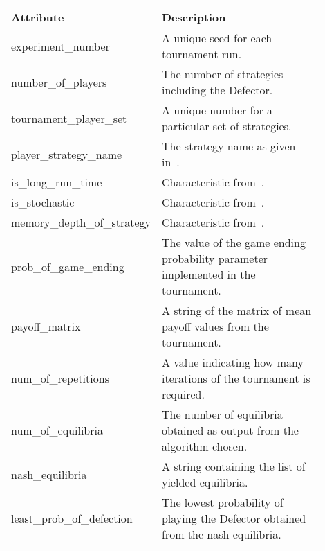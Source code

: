 \begin{table}
\centering
\begin{tabular}{>{\raggedright}p{0.3\linewidth}>{\raggedright\arraybackslash}p{0.6\linewidth}}
    \toprule
    \textbf{Attribute}                   & \textbf{Description} \\
    \midrule
    experiment\_number           & A unique seed for each tournament run. \\
       
    number\_of\_players           & The number of strategies including the
    Defector. \\
             
    tournament\_player\_set       & A unique number for a particular set of
    strategies. \\
        
    player\_strategy\_name        & The strategy name as given
    in~\cite{axelrodproject}. \\
      
    is\_long\_run\_time            & Characteristic from~\cite{axelrodproject}.
    \\
          
    is\_stochastic               & Characteristic from~\cite{axelrodproject}. \\ 
       
    memory\_depth\_of\_strategy    & Characteristic from~\cite{axelrodproject}.
    \\
       
    prob\_of\_game\_ending         & The value of the game ending probability
    parameter implemented in the tournament. \\
         
    payoff\_matrix               & A string of the matrix of mean payoff values
    from the tournament. \\
    
    num\_of\_repetitions          & A value indicating how many iterations of
    the tournament is required. \\  
          
    num\_of\_equilibria           & The number of equilibria obtained as output
    from the algorithm chosen. \\
        
    nash\_equilibria             & A string containing the list of yielded
    equilibria. \\
    
    least\_prob\_of\_defection     & The lowest probability of playing the
    Defector obtained from the nash equilibria. \\ 
     

\end{tabular}
\end{table}
